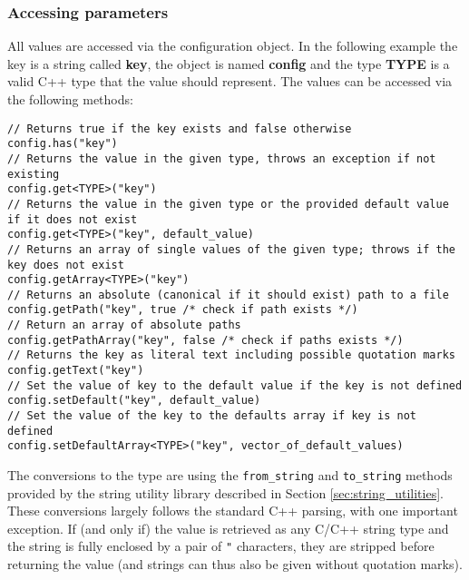 \subsubsection{Accessing parameters}
\label{sec:accessing_parameters}
All values are accessed via the configuration object. In the following example the key is a string called \textbf{key}, the object is named \textbf{config} and the type \textbf{TYPE} is a valid C++ type that the value should represent. The values can be accessed via the following methods:
\begin{verbatim}
// Returns true if the key exists and false otherwise
config.has("key") 
// Returns the value in the given type, throws an exception if not existing
config.get<TYPE>("key") 
// Returns the value in the given type or the provided default value if it does not exist
config.get<TYPE>("key", default_value) 
// Returns an array of single values of the given type; throws if the key does not exist
config.getArray<TYPE>("key")
// Returns an absolute (canonical if it should exist) path to a file
config.getPath("key", true /* check if path exists */)
// Return an array of absolute paths
config.getPathArray("key", false /* check if paths exists */)
// Returns the key as literal text including possible quotation marks
config.getText("key") 
// Set the value of key to the default value if the key is not defined
config.setDefault("key", default_value) 
// Set the value of the key to the defaults array if key is not defined
config.setDefaultArray<TYPE>("key", vector_of_default_values)
\end{verbatim}

The conversions to the type are using the \texttt{from\_string} and \texttt{to\_string} methods provided by the string utility library described in Section \ref{sec:string_utilities}. These conversions largely follows the standard C++ parsing, with one important exception. If (and only if) the value is retrieved as any C/C++ string type and the string is fully enclosed by a pair of \texttt{"} characters, they are stripped before returning the value (and strings can thus also be given without quotation marks).

